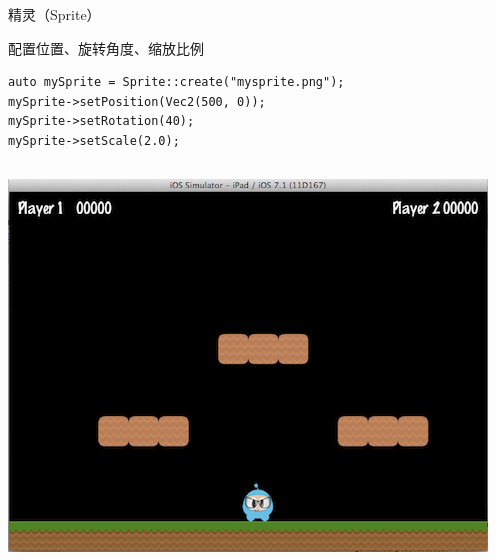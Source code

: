 \documentclass{beamer}
\begin{document}
\begin{frame}[fragile]{精灵（Sprite）}
\begin{block}{配置位置、旋转角度、缩放比例}
\begin{verbatim}
auto mySprite = Sprite::create("mysprite.png");
mySprite->setPosition(Vec2(500, 0));
mySprite->setRotation(40);
mySprite->setScale(2.0);
\end{verbatim}
\end{block}
\begin{columns}
\begin{column}{0.3\textwidth}
\includegraphics[width=\textwidth]
{figures/set_position}
\end{column}
\end{columns}
\end{frame}
\end{document}

